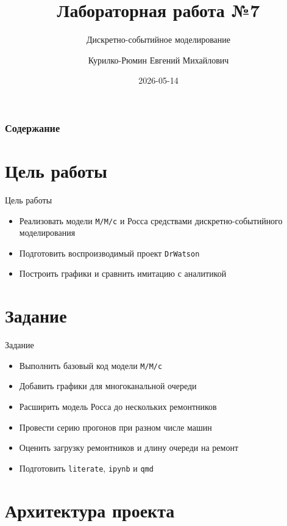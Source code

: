 \documentclass[
  ignorenonframetext,
  aspectratio=169,
  russian,
]{beamer}
\title{Лабораторная работа №7}
\subtitle{Дискретно-событийное моделирование}
\author{Курилко-Рюмин Евгений Михайлович}
\date{2026-05-14}
\providecommand{\tightlist}{%
  \setlength{\itemsep}{0pt}\setlength{\parskip}{0pt}}\usepackage{longtable,booktabs,array}
\renewcommand*\contentsname{Содержание}
\newcommand\contentsname{Содержание}
\begin{document}
\frame{\titlepage}

\renewcommand*\contentsname{Содержание}
\begin{frame}[allowframebreaks]
  \frametitle{Содержание}
  \setcounter{tocdepth}{1}
  \tableofcontents
\end{frame}

\section{Цель
работы}\label{ux446ux435ux43bux44c-ux440ux430ux431ux43eux442ux44b}

\begin{frame}[fragile]{Цель работы}
\begin{itemize}[<+->]
\tightlist
\item
  Реализовать модели \texttt{M/M/c} и Росса средствами
  дискретно-событийного моделирования
\item
  Подготовить воспроизводимый проект \texttt{DrWatson}
\item
  Построить графики и сравнить имитацию с аналитикой
\end{itemize}
\end{frame}

\section{Задание}\label{ux437ux430ux434ux430ux43dux438ux435}

\begin{frame}[fragile]{Задание}
\begin{itemize}[<+->]
\tightlist
\item
  Выполнить базовый код модели \texttt{M/M/c}
\item
  Добавить графики для многоканальной очереди
\item
  Расширить модель Росса до нескольких ремонтников
\item
  Провести серию прогонов при разном числе машин
\item
  Оценить загрузку ремонтников и длину очереди на ремонт
\item
  Подготовить \texttt{literate}, \texttt{ipynb} и \texttt{qmd}
\end{itemize}
\end{frame}

\section{Архитектура
проекта}\label{ux430ux440ux445ux438ux442ux435ux43aux442ux443ux440ux430-ux43fux440ux43eux435ux43aux442ux430}
\end{document}
